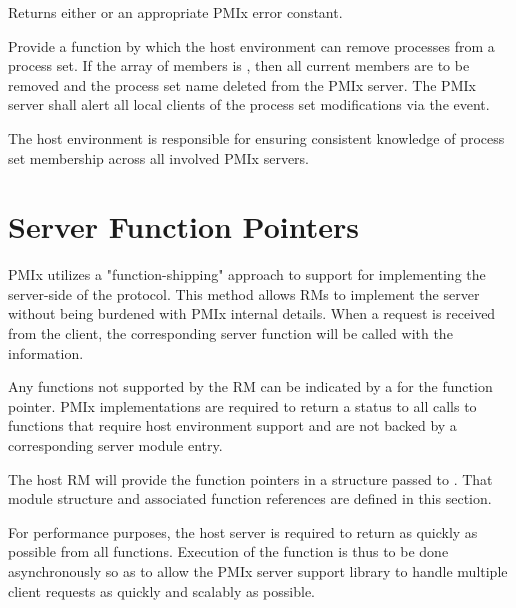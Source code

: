 \begin{arglist}
\end{arglist}

Returns either  or an appropriate \ac{PMIx} error
constant.


\descr

Provide a function by which the host environment can remove processes from a
process set. If the array of members is , then all current members
are to be removed and the process set name deleted from the \ac{PMIx} server.
The \ac{PMIx} server shall alert all local clients of the process set
modifications via the  event.

\advicermstart
The host environment is responsible for ensuring consistent knowledge of
process set membership across all involved \ac{PMIx} servers.
\advicermend


\section{Server Function Pointers}

\ac{PMIx} utilizes a "function-shipping" approach to support for implementing the server-side of the protocol. This method allows \acp{RM} to implement the server without being burdened with \ac{PMIx} internal details. When a request is received from the client, the corresponding server function will be called with the information.

Any functions not supported by the \ac{RM} can be indicated by a  for the function pointer. \ac{PMIx} implementations are required to return a  status to all calls to functions that require host environment support and are not backed by a corresponding server module entry.

The host \ac{RM} will provide the function pointers in a  structure passed to .
That module structure and associated function references are defined in this section.

\advicermstart
For performance purposes, the host server is required to return as quickly as possible from all functions. Execution of
the function is thus to be done asynchronously so as to allow the \ac{PMIx} server support library to handle multiple client requests
as quickly and scalably as possible.

